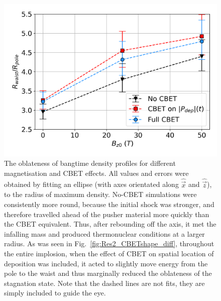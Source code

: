\begin{figure}[t!]
    \includegraphics[width=0.6\linewidth]{Results2/Images/R2R0_errors.png}
    \centering
    \caption{The oblateness of bangtime density profiles for different magnetisation and \ac{CBET} effects.
    All values and errors were obtained by fitting an ellipse (with axes orientated along $\hat{\vec{x}}$ and $\hat{\vec{z}}$), to the radius of maximum density.
    No-\ac{CBET} simulations were consistently more round, because the initial shock was stronger, and therefore travelled ahead of the pusher material more quickly than the \ac{CBET} equivalent.
    Thus, after rebounding off the axis, it met the infalling mass and produced thermonuclear conditions at a larger radius.
    As was seen in Fig.~\ref{fig:Res2_CBETshape_diff}, throughout the entire implosion, when the effect of \ac{CBET} on spatial location of deposition was included, it acted to slightly move energy from the pole to the waist and thus marginally reduced the oblateness of the stagnation state.
    Note that the dashed lines are not fits, they are simply included to guide the eye.}%
    \label{fig:Res2_R2R0_errors}
\end{figure}

